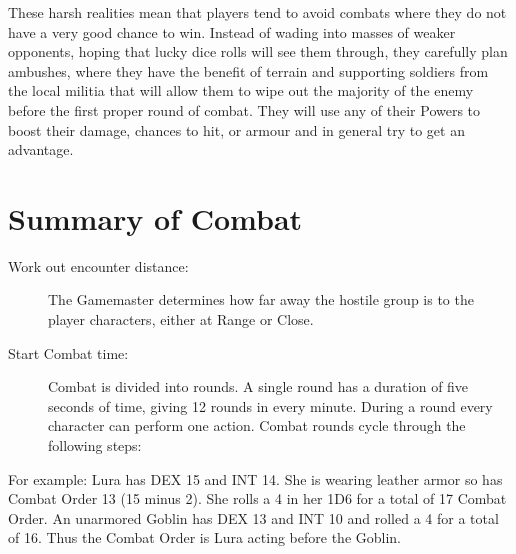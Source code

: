 These harsh realities mean that players tend to avoid combats where they do not have a very good chance to win. Instead of wading into masses of weaker opponents, hoping that lucky dice rolls will see them through, they carefully plan ambushes, where they have the benefit of terrain and supporting soldiers from the local militia that will allow them to wipe out the majority of the enemy before the first proper round of combat. They will use any of their Powers to boost their damage, chances to hit, or armour and in general try to get an advantage.


\section{Summary of Combat}
\begin{description}
	\item[Work out encounter distance:] The Gamemaster determines how far away the hostile group is to the player characters, either at Range or Close.

	\item[Start Combat time:] Combat is divided into rounds. A single round has a duration of five seconds of time, giving 12 rounds in every minute. During a round every character can perform one action. Combat rounds cycle through the following steps:
\end{description}

\begin{rpg-examplebox}
  For example: Lura has DEX 15 and INT 14. She is wearing leather armor so has Combat Order 13 (15 minus 2). She rolls a 4 in her 1D6 for a total of 17 Combat Order. An unarmored Goblin has DEX 13 and INT 10 and rolled a 4 for a total of 16. Thus the Combat Order is Lura acting before the Goblin.
\end{rpg-examplebox}

